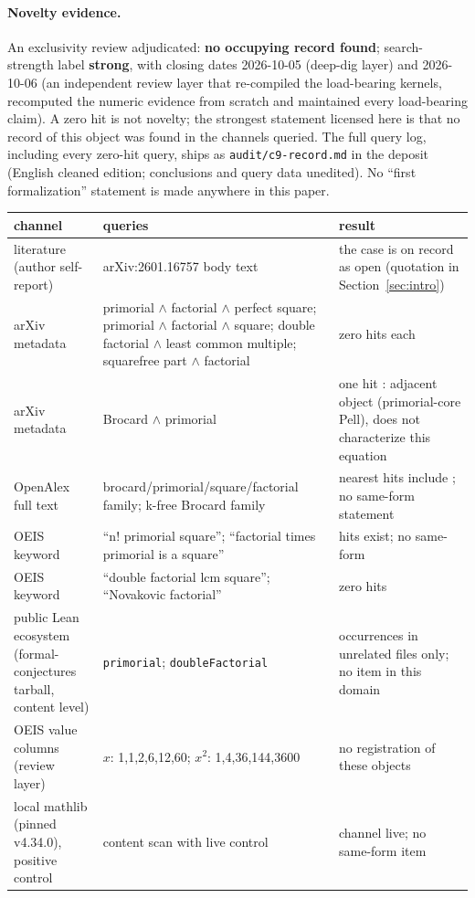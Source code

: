 \documentclass[11pt]{article}
\theoremstyle{definition}
\begin{document}
\paragraph{Novelty evidence.} An exclusivity review adjudicated:
\textbf{no occupying record found};
search-strength label \textbf{strong}, with closing dates 2026-10-05
(deep-dig layer) and 2026-10-06 (an independent review layer that re-compiled
the load-bearing kernels, recomputed the numeric evidence from scratch and
maintained every load-bearing claim). A zero hit is not novelty; the
strongest statement licensed here is that no record of this object was found
in the channels queried. The full query log, including every zero-hit query,
ships as \texttt{audit/c9-record.md} in the deposit (English cleaned edition;
conclusions and query data unedited). No ``first formalization'' statement is
made anywhere in this paper.

\begin{center}\small
\begin{tabular}{p{3.4cm}p{5.4cm}p{6.0cm}}
\hline
channel & queries & result \\
\hline
literature (author self-report) & arXiv:2601.16757 body text & the case is on
record as open (quotation in Section~\ref{sec:intro}) \cite{novakovic2026} \\
arXiv metadata & primorial $\wedge$ factorial $\wedge$ perfect square;
primorial $\wedge$ factorial $\wedge$ square; double factorial $\wedge$
least common multiple; squarefree part $\wedge$ factorial & zero hits each \\
arXiv metadata & Brocard $\wedge$ primorial & one hit \cite{peixoto2026}:
adjacent object (primorial-core Pell), does not characterize this equation \\
OpenAlex full text & brocard/primorial/square/factorial family; k-free
Brocard family & nearest hits include
\cite{novakovic2026,novakovic2026b}; no same-form statement \\
OEIS keyword & ``n! primorial square''; ``factorial times primorial is a
square'' & hits exist; no same-form \\
OEIS keyword & ``double factorial lcm square''; ``Novakovic factorial'' &
zero hits \\
public Lean ecosystem (formal-conjectures tarball, content level) &
\texttt{primorial}; \texttt{doubleFactorial} & occurrences in unrelated
files only; no item in this domain \\
OEIS value columns (review layer) & $x$: 1,1,2,6,12,60; $x^2$: 1,4,36,144,3600
& no registration of these objects \\
local mathlib (pinned v4.34.0), positive control & content scan with live
control & channel live; no same-form item \\
\hline
\end{tabular}
\end{center}
\end{document}
